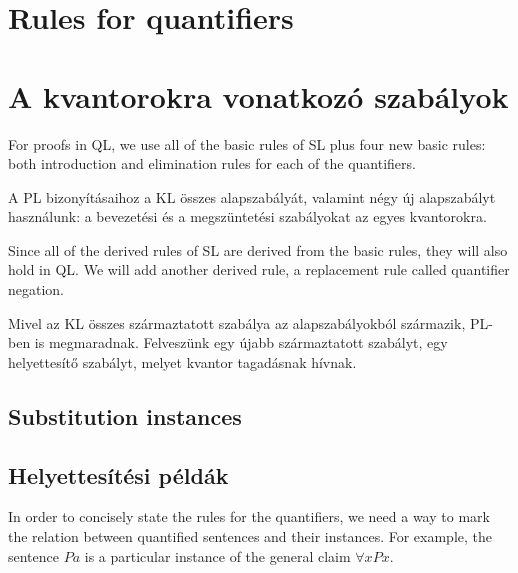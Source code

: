 



\section*{Rules for quantifiers}

\section{A kvantorokra vonatkozó szabályok}

For proofs in QL, we use all of the basic rules of SL plus four new basic rules: both introduction and elimination rules for each of the quantifiers.

A PL bizonyításaihoz a KL összes alapszabályát, valamint négy új alapszabályt használunk: a bevezetési és a megszüntetési szabályokat az egyes kvantorokra.

Since all of the derived rules of SL are derived from the basic rules, they will also hold in QL. We will add another derived rule, a replacement rule called quantifier negation.

Mivel az KL összes származtatott szabálya az alapszabályokból származik, PL-ben is megmaradnak. Felveszünk egy újabb származtatott szabályt, egy helyettesítő szabályt, melyet kvantor tagadásnak hívnak.

\subsection{Substitution instances}

\subsection{Helyettesítési példák}

In order to concisely state the rules for the quantifiers, we need a way to mark the relation between quantified sentences and their instances. For example, the sentence $Pa$ is a particular instance of the general claim $\forall x Px$.

